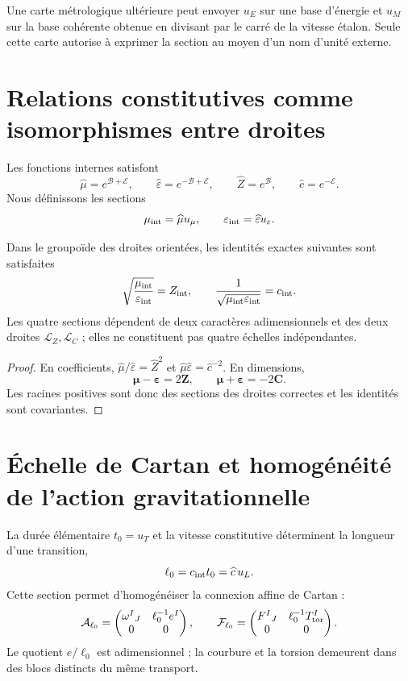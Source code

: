 Une carte métrologique ultérieure peut envoyer \(u_E\) sur une base d'énergie et
\(u_M\) sur la base cohérente obtenue en divisant par le carré de la vitesse
étalon. Seule cette carte autorise à exprimer la section au moyen d'un nom
d'unité externe.

\section{Relations constitutives comme isomorphismes entre droites}

Les fonctions internes satisfont
\[
 \widehat\mu=e^{\mathcal B+\mathcal E},
 \qquad
 \widehat\varepsilon=e^{-\mathcal B+\mathcal E},
 \qquad
 \widehat Z=e^{\mathcal B},
 \qquad
 \widehat c=e^{-\mathcal E}.
\]
Nous définissons les sections
\[
 \mu_{\rm int}=\widehat\mu u_\mu,
 \qquad
 \varepsilon_{\rm int}=\widehat\varepsilon u_\varepsilon.
\]

\begin{theorem}
Dans le groupoïde des droites orientées, les identités exactes suivantes sont satisfaites
\[
 \sqrt{\frac{\mu_{\rm int}}{\varepsilon_{\rm int}}}
 =Z_{\rm int},
 \qquad
 \frac1{\sqrt{\mu_{\rm int}\varepsilon_{\rm int}}}
 =c_{\rm int}.
\]
Les quatre sections dépendent de deux caractères adimensionnels et des deux
droites \(\mathcal L_Z,\mathcal L_C\) ; elles ne constituent pas quatre échelles
indépendantes.
\end{theorem}

\begin{proof}
En coefficients,
\(\widehat\mu/\widehat\varepsilon=\widehat Z^2\) et
\(\widehat\mu\widehat\varepsilon=\widehat c^{-2}\). En dimensions,
\[
 \boldsymbol\mu-\boldsymbol\varepsilon=2\mathbf Z,
 \qquad
 \boldsymbol\mu+\boldsymbol\varepsilon=-2\mathbf C.
\]
Les racines positives sont donc des sections des droites correctes et les
identités sont covariantes.
\end{proof}

\section{Échelle de Cartan et homogénéité de l'action gravitationnelle}

La durée élémentaire \(t_0=u_T\) et la vitesse constitutive déterminent la
longueur d'une transition,
\[
 \ell_0=c_{\rm int}t_0=\widehat c\,u_L.
\]
Cette section permet d'homogénéiser la connexion affine de Cartan :
\[
 \mathcal A_{\ell_0}
 =\begin{pmatrix}
 \omega^I{}_J&\ell_0^{-1}e^I\\
 0&0
 \end{pmatrix},
 \qquad
 \mathcal F_{\ell_0}
 =\begin{pmatrix}
 F^I{}_J&\ell_0^{-1}T_{\rm tor}^I\\
 0&0
 \end{pmatrix}.
\]
Le quotient \(e/\ell_0\) est adimensionnel ; la courbure et la torsion demeurent dans
des blocs distincts du même transport.

